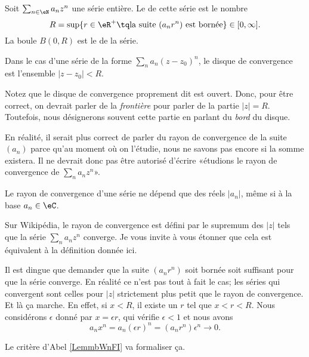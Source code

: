\begin{definition}  \label{DefZWKOZOl}
	Soit \( \sum_{n\in \eN}a_nz^n\) une série entière. Le  de cette série est le nombre
	\begin{equation}
		R=\sup\{ r\in \eR^+\tq \text{la suite }(a_nr^n)\text{ est bornée} \}\in\mathopen[ 0 , \infty \mathclose].
	\end{equation}
	La boule \( B(0,R)\) est le  de la série.

	Dans le cas d'une série de la forme  \( \sum_n a_n(z-z_0)^n\), le disque de convergence est l'ensemble \( | z-z_0 |< R\).
\end{definition}

\begin{normaltext}
	Notez que le disque de convergence proprement dit est ouvert. Donc, pour être correct, on devrait parler de la \emph{frontière} pour parler de la partie \( | z |=R\). Toutefois, nous désignerons souvent cette partie en parlant du \emph{bord} du disque.
\end{normaltext}

\begin{normaltext}
	En réalité, il serait plus correct de parler du rayon de convergence de la suite \( (a_n)\) parce qu'au moment où on l'étudie, nous ne savons pas encore si la somme existera. Il ne devrait donc pas être autorisé d'écrire «étudions le rayon de convergence de \( \sum_na_nz^n\)».

	Le rayon de convergence d'une série ne dépend que des réels \( | a_n |\), même si à la base \( a_n\in \eC\).
\end{normaltext}

\begin{normaltext}
	Sur Wikipédia\cite{BIBooRVNCooAKQeld}, le rayon de convergence est défini par le supremum des \( | z |\) tels que la série \( \sum_na_nz^n\) converge. Je vous invite à vous étonner que cela est équivalent à la définition donnée ici.

	Il est dingue que demander que la suite \( (a_nr^n)\) soit bornée soit suffisant pour que la série converge. En réalité ce n'est pas tout à fait le cas; les séries qui convergent sont celles pour \( | z |\) strictement plus petit que le rayon de convergence. Et là ça marche. En effet, si \( x<R\), il existe un \( r\) tel que \( x<r<R\). Nous considérons \( \epsilon\) donné par  \( x=\epsilon r\), qui vérifie \( \epsilon<1\) et nous avons
	\begin{equation}
		a_nx^n=a_n(\epsilon r)^n=(a_nr^n)\epsilon^n\to 0.
	\end{equation}

	Le critère d'Abel \ref{LemmbWnFI} va formaliser ça.
\end{normaltext}

